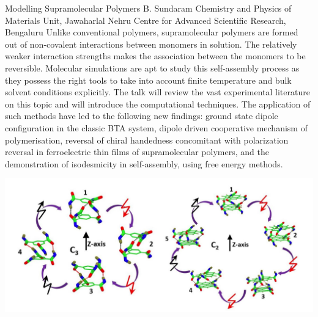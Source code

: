 
    \begin{abstract_online}{Modelling Supramolecular Polymers}{%
        B. Sundaram}{%
        \KLtag}{%
        Chemistry and Physics of Materials Unit, Jawaharlal Nehru Centre for Advanced Scientific Research, Bengaluru}
    Unlike conventional polymers, supramolecular polymers are formed out of non-covalent interactions between monomers in solution. The relatively weaker interaction strengths makes the association between the monomers to be reversible. Molecular simulations are apt to study this self-assembly process as they possess the right tools to take into account finite temperature and bulk solvent conditions explicitly. The talk will review the vast experimental literature on this topic and will introduce the computational techniques. The application of such methods have led to the following new findings: ground state dipole configuration in the classic BTA system, dipole driven cooperative mechanism of polymerisation, reversal of chiral handedness concomitant with polarization reversal in ferroelectric thin films of supramolecular polymers, and the demonstration of isodesmicity in self-assembly, using free energy methods. \begin{center}  \includegraphics[width=\linewidth]{abstracts/txt/figures/bala.png}  \end{center}  
    
    \end{abstract_online}
    